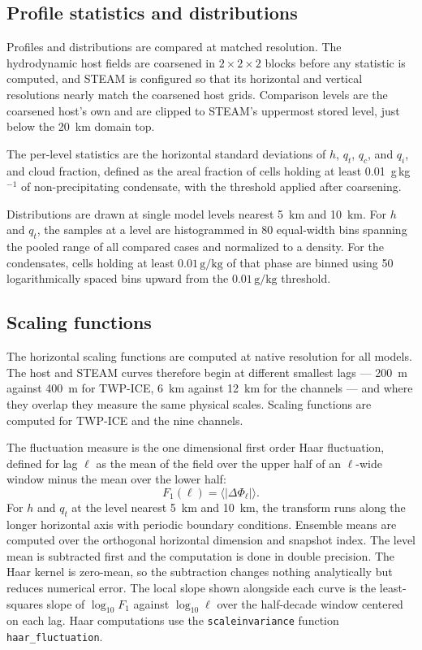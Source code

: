 \documentclass{article}
\begin{document}
\subsection{Profile statistics and distributions}
\label{ssect:matched stats}

Profiles and distributions are compared at matched resolution. The
hydrodynamic host fields are coarsened in $2\times 2\times 2$ blocks
before any statistic is computed, and STEAM is configured so that its
horizontal and vertical resolutions nearly match the coarsened host
grids. Comparison levels are the coarsened host's own and are clipped
to STEAM's uppermost stored level, just below the 20~km domain top.

The per-level statistics are the horizontal standard deviations of
$h$, $q_t$, $q_c$, and $q_i$, and cloud fraction, defined as the areal
fraction of cells holding at least 0.01~g\,kg$^{-1}$ of
non-precipitating condensate, with the threshold applied after
coarsening.

Distributions are drawn at single model levels nearest 5~km and 10~km. For $h$
and $q_t$, the samples at a level are histogrammed in 80 equal-width
bins spanning the pooled range of all compared cases and normalized to a density. For the
condensates, cells holding at least $0.01\,\mathrm{g/kg}$ of that
phase are binned using 50 logarithmically spaced bins upward from the $0.01\,\mathrm{g/kg}$
threshold.

\subsection{Scaling functions}
\label{ssect:scaling functions}

The horizontal scaling functions are computed at native resolution
for all models. The host and STEAM curves therefore begin at different
smallest lags --- 200~m against 400~m for TWP-ICE, 6~km against 12~km
for the channels --- and where they overlap they measure the same
physical scales. Scaling functions are computed for TWP-ICE and the
nine channels.

The fluctuation measure is the one dimensional first order Haar fluctuation, defined for lag
$\ell$ as the mean of the field over the upper half of an $\ell$-wide
window minus the mean over the lower half:
$$F_1(\ell) = \langle |\Delta\Phi_\ell| \rangle.$$
For $h$ and $q_t$ at
the level nearest 5~km and 10~km, the transform runs along the longer
horizontal axis with periodic boundary conditions. Ensemble means are computed over the orthogonal horizontal dimension and snapshot index. The level mean is subtracted first
and the computation is done in double precision. The Haar kernel is
zero-mean, so the subtraction changes nothing analytically but reduces numerical error. The local slope shown
alongside each curve is the least-squares slope of $\log_{10} F_1$
against $\log_{10}\ell$ over the half-decade window centered on each
lag. Haar computations use the \verb|scaleinvariance| function \verb|haar_fluctuation|.
\end{document}
